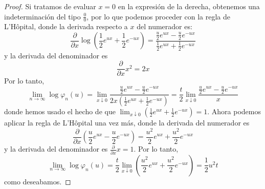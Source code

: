 \documentclass[11pt,notitlepage]{article}
\begin{document}
\begin{proof}
 Si tratamos de evaluar $x = 0$ en la expresión de la derecha, obtenemos una indeterminación del tipo $\frac{0}{0}$, por lo que podemos proceder con la regla de L'H\^opital, donde la derivada respecto a $x$ del numerador es:
 \[\frac{\partial}{\partial x}\log \left(\frac{1}{2}e^{ux} + \frac{1}{2}e^{-ux} \right) = \dfrac{\frac{u}{2}e^{ux} - \frac{u}{2}e^{-ux}}{\frac{1}{2}e^{ux} + \frac{1}{2}e^{-ux}} \]
 y la derivada del denominador es
 \[\frac{\partial}{\partial x} x^2 = 2x\]
 Por lo tanto,
 \[ \lim_{n \rightarrow\infty} \log \varphi_n(u) = \lim_{x\downarrow0} \dfrac{\frac{u}{2}e^{ux} - \frac{u}{2}e^{-ux}}{2x\left(\frac{1}{2}e^{ux} + \frac{1}{2}e^{-ux}\right)} = \frac{t}{2} \lim_{x\downarrow0} \dfrac{\frac{u}{2}e^{ux} - \frac{u}{2}e^{-ux}}{x} \]
 donde hemos usado el hecho de que $\lim_{x\downarrow0} \left(\frac{1}{2}e^{ux} + \frac{1}{2}e^{-ux}\right) = 1 $. Ahora podemos aplicar la regla de L'H\^opital una vez más, donde la derivada del numerador es
 \[\frac{\partial}{\partial x}\left( \frac{u}{2}e^{ux} - \frac{u}{2}e^{-ux} \right)  = \frac{u^2}{2}e^{ux} + \frac{u^2}{2}e^{-ux}\]
 y la derivada del denominador es $\frac{\partial}{\partial x}x = 1$. Por lo tanto,
 \[\lim_{n \rightarrow\infty} \log \varphi_n(u) = \frac{t}{2} \lim_{x\downarrow0} \left( \frac{u^2}{2}e^{ux} + \frac{u^2}{2}e^{-ux} \right) = \frac{1}{2}u^2t \]
 como deseabamos.
\end{proof}
\end{document}
